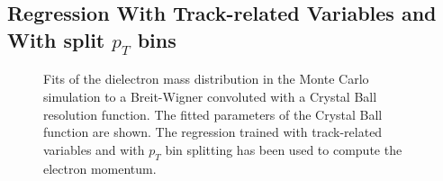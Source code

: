 \documentclass{cmspaper}
\begin{document}
\subsection{Regression With Track-related Variables and With split $p_{T}$ bins }

\begin{figure}[h]
\centering
	\caption{Fits of the dielectron mass distribution in the Monte Carlo simulation to
        a Breit-Wigner convoluted with a Crystal Ball resolution function. The fitted parameters 
        of the Crystal Ball function are shown. The regression trained with track-related variables
        and with $p_{T}$ bin splitting has been used to compute the electron momentum.}
	\label{fig:ZMassFit_MC_Regression4}
\end{figure}
\end{document}
